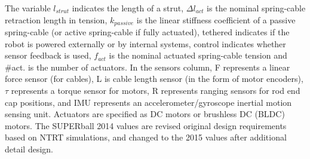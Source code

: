 \begin{table}[ht]
\caption{\SB{} and Related Robots Design Overview.} 

\begin{center}%
\end{center}
\label{design_req}
\fontsize{10pt}{12pt}\selectfont
The variable $l_{strut}$ indicates the length of a strut, $\Delta l_{act}$ is the nominal spring-cable retraction length in tension, $k_{passive}$ is the linear stiffness coefficient of a passive spring-cable (or active spring-cable if fully actuated), tethered indicates if the robot is powered externally or by internal systems, control indicates whether sensor feedback is used, $f_{act}$ is the nominal actuated spring-cable tension and \#act. is the number of actuators. In the sensors column, F represents a linear force sensor (for cables), L is cable length sensor (in the form of motor encoders), $\tau$ represents a torque sensor for motors, R represents ranging sensors for rod end cap positions, and IMU represents an accelerometer/gyroscope inertial motion sensing unit. Actuators are specified as DC motors or brushless DC (BLDC) motors. The SUPERball 2014 values are revised original design requirements based on NTRT simulations, and changed to the 2015 values after additional detail design. %


\end{table}

